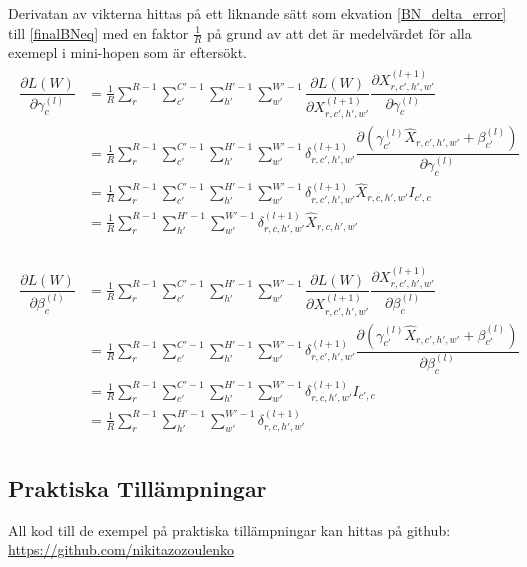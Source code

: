 \documentclass[a4paper,11pt,twoside]{article}
\newcommand*{\pd}[2]{\ensuremath{\dfrac{\partial #1}{\partial #2}}}
\begin{document}
Derivatan av vikterna hittas på ett liknande sätt som ekvation \eqref{BN_delta_error} till \eqref{finalBNeq} med en faktor $\frac{1}{R}$ på grund av att det är medelvärdet för alla exemepl i mini-hopen som är eftersökt. \cite{webBN1} \cite{webBN2}
\begin{align}
\begin{split}
	\pd{L(W)}{\gamma^{(l)}_{c}}
		& = \frac{1}{R}\sum^{R-1}_{r} \sum^{C'-1}_{c'} \sum^{H'-1}_{h'} \sum^{W'-1}_{w'} \pd{L(W)}{X^{(l+1)}_{r,c',h',w'}} \pd{X^{(l+1)}_{r,c',h',w'}}{\gamma^{(l)}_{c}} \\
		& = \frac{1}{R}\sum^{R-1}_{r} \sum^{C'-1}_{c'} \sum^{H'-1}_{h'} \sum^{W'-1}_{w'} \delta^{(l+1)}_{r,c',h',w'}  \pd{({\gamma_{c'}^{(l)} \hat{X}_{r,c',h',w'} + \beta_{c'}^{(l)}})}{\gamma^{(l)}_{c}} \\
		& = \frac{1}{R}\sum^{R-1}_{r} \sum^{C'-1}_{c'} \sum^{H'-1}_{h'} \sum^{W'-1}_{w'} \delta^{(l+1)}_{r,c',h',w'} \hat{X}_{r,c,h',w'} I_{c',c}\\
		& = \frac{1}{R}\sum^{R-1}_{r} \sum^{H'-1}_{h'} \sum^{W'-1}_{w'} \delta^{(l+1)}_{r,c,h',w'} \hat{X}_{r,c,h',w'} \\
\end{split}
\end{align}


\begin{align}
\begin{split}
	\pd{L(W)}{\beta^{(l)}_{c}}
		& = \frac{1}{R}\sum^{R-1}_{r} \sum^{C'-1}_{c'} \sum^{H'-1}_{h'} \sum^{W'-1}_{w'} \pd{L(W)}{X^{(l+1)}_{r,c',h',w'}} \pd{X^{(l+1)}_{r,c',h',w'}}{\beta^{(l)}_{c}} \\
		& = \frac{1}{R}\sum^{R-1}_{r} \sum^{C'-1}_{c'} \sum^{H'-1}_{h'} \sum^{W'-1}_{w'} \delta^{(l+1)}_{r,c',h',w'}  \pd{({\gamma_{c'}^{(l)} \hat{X}_{r,c',h',w'} + \beta_{c'}^{(l)}})}{\beta^{(l)}_{c}} \\
		& = \frac{1}{R}\sum^{R-1}_{r} \sum^{C'-1}_{c'} \sum^{H'-1}_{h'} \sum^{W'-1}_{w'} \delta^{(l+1)}_{r,c,h',w'} I_{c',c}\\
		& = \frac{1}{R}\sum^{R-1}_{r} \sum^{H'-1}_{h'} \sum^{W'-1}_{w'} \delta^{(l+1)}_{r,c,h',w'} \\
\end{split}
\end{align}

\subsection{Praktiska Tillämpningar}
All kod till de exempel på praktiska tillämpningar kan hittas på github: \url{https://github.com/nikitazozoulenko}
\end{document}
